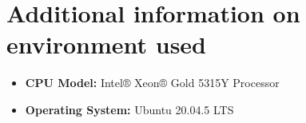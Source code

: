 \section{Additional information on environment used}
\begin{itemize}
    \small
    \item \textbf{CPU Model:} Intel® Xeon® Gold 5315Y Processor
    \item \textbf{Operating System:} Ubuntu 20.04.5 LTS
\end{itemize}